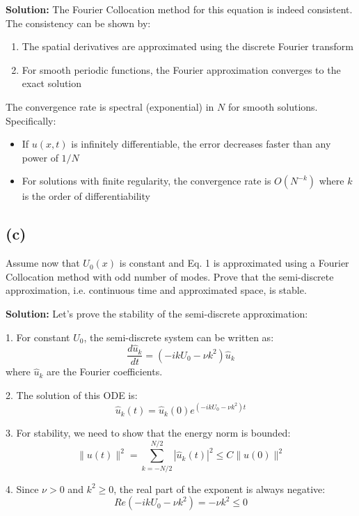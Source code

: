 \documentclass{article}
\begin{document}
\textbf{Solution:}
The Fourier Collocation method for this equation is indeed consistent. The consistency can be shown by:
\begin{enumerate}
    \item The spatial derivatives are approximated using the discrete Fourier transform
    \item For smooth periodic functions, the Fourier approximation converges to the exact solution
\end{enumerate}

The convergence rate is spectral (exponential) in $N$ for smooth solutions. Specifically:
\begin{itemize}
    \item If $u(x,t)$ is infinitely differentiable, the error decreases faster than any power of $1/N$
    \item For solutions with finite regularity, the convergence rate is $O(N^{-k})$ where $k$ is the order of differentiability
\end{itemize}

\subsection*{(c)}
Assume now that $U_0(x)$ is constant and Eq. 1 is approximated using a Fourier Collocation method with odd number of modes. Prove that the semi-discrete approximation, i.e. continuous time and approximated space, is stable.

\textbf{Solution:}
Let's prove the stability of the semi-discrete approximation:

1. For constant $U_0$, the semi-discrete system can be written as:
\begin{equation}
    \frac{d\hat{u}_k}{dt} = (-ikU_0 - \nu k^2)\hat{u}_k
\end{equation}
where $\hat{u}_k$ are the Fourier coefficients.

2. The solution of this ODE is:
\begin{equation}
    \hat{u}_k(t) = \hat{u}_k(0)e^{(-ikU_0 - \nu k^2)t}
\end{equation}

3. For stability, we need to show that the energy norm is bounded:
\begin{equation}
    \|u(t)\|^2 = \sum_{k=-N/2}^{N/2} |\hat{u}_k(t)|^2 \leq C\|u(0)\|^2
\end{equation}

4. Since $\nu > 0$ and $k^2 \geq 0$, the real part of the exponent is always negative:
\begin{equation}
    Re(-ikU_0 - \nu k^2) = -\nu k^2 \leq 0
\end{equation}
\end{document}
